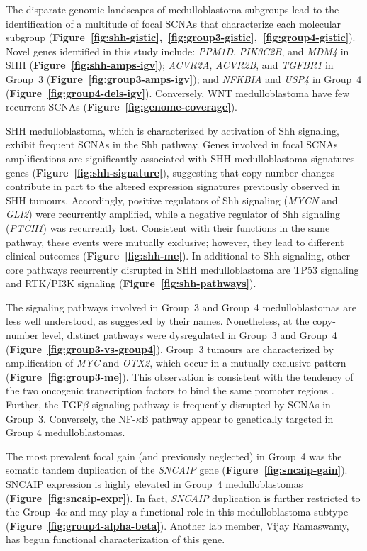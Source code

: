 \documentclass[11pt,letterpaper]{article}
\theoremstyle{definition}
\begin{document}
The disparate genomic landscapes of medulloblastoma subgroups lead to the identification of a multitude of focal SCNAs that characterize each molecular subgroup (\textbf{Figure~\ref{fig:shh-gistic},~\ref{fig:group3-gistic},~\ref{fig:group4-gistic}}). Novel genes identified in this study include: \emph{PPM1D}, \emph{PIK3C2B}, and \emph{MDM4} in SHH (\textbf{Figure~\ref{fig:shh-amps-igv}}); \emph{ACVR2A}, \emph{ACVR2B}, and \emph{TGFBR1} in Group~3 (\textbf{Figure~\ref{fig:group3-amps-igv}}); and \emph{NFKBIA} and \emph{USP4} in Group~4 (\textbf{Figure~\ref{fig:group4-dels-igv}}). Conversely, WNT medulloblastoma have few recurrent SCNAs (\textbf{Figure~\ref{fig:genome-coverage}}). 

SHH medulloblastoma, which is characterized by activation of Shh signaling, exhibit frequent SCNAs in the Shh pathway. Genes involved in focal SCNAs amplifications are significantly associated with SHH medulloblastoma signatures genes (\textbf{Figure~\ref{fig:shh-signature}}), suggesting that copy-number changes contribute in part to the altered expression signatures previously observed in SHH tumours. Accordingly, positive regulators of Shh signaling (\emph{MYCN} and \emph{GLI2}) were recurrently amplified, while a negative regulator of Shh signaling (\emph{PTCH1}) was recurrently lost. Consistent with their functions in the same pathway, these events were mutually exclusive; however, they lead to different clinical outcomes (\textbf{Figure~\ref{fig:shh-me}}). In additional to Shh signaling, other core pathways recurrently disrupted in SHH medulloblastoma are TP53 signaling and RTK/PI3K signaling (\textbf{Figure~\ref{fig:shh-pathways}}).

The signaling pathways involved in Group~3 and Group~4 medulloblastomas are less well understood, as suggested by their names. Nonetheless, at the copy-number level, distinct pathways were dysregulated in Group~3 and Group~4 (\textbf{Figure~\ref{fig:group3-vs-group4}}). Group~3 tumours are characterized by amplification of \emph{MYC} and \emph{OTX2}, which occur in a mutually exclusive pattern (\textbf{Figure~\ref{fig:group3-me}}). This observation is consistent with the tendency of the two oncogenic transcription factors to bind the same promoter regions . Further, the TGF$\beta$ signaling pathway is frequently disrupted by SCNAs in Group~3. Conversely, the NF-$\kappa$B pathway appear to genetically targeted in Group 4 medulloblastomas.

The most prevalent focal gain (and previously neglected) in Group~4 was the somatic tandem duplication of the \emph{SNCAIP} gene (\textbf{Figure~\ref{fig:sncaip-gain}}). SNCAIP expression is highly elevated in Group~4 medulloblastomas (\textbf{Figure~\ref{fig:sncaip-expr}}). In fact, \emph{SNCAIP} duplication is further restricted to the Group~4$\alpha$ and may play a functional role in this medulloblastoma subtype (\textbf{Figure~\ref{fig:group4-alpha-beta}}). Another lab member, Vijay Ramaswamy, has begun functional characterization of this gene.
\end{document}
